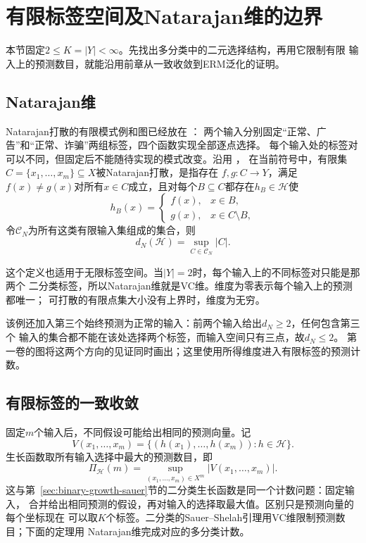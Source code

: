 \section{有限标签空间及Natarajan维的边界}
\label{sec:multiclass-dimensions}

本节固定$2\leq K=|Y|<\infty$。先找出多分类中的二元选择结构，再用它限制有限
输入上的预测数目，就能沿用前章从一致收敛到ERM泛化的证明。

\subsection{Natarajan维}

Natarajan打散的有限模式例和图已经放在
：
两个输入分别固定“正常、广告”和“正常、诈骗”两组标签，四个函数实现全部逐点选择。
每个输入处的标签对可以不同，但固定后不能随待实现的模式改变。沿用
，
在当前符号中，有限集$C=\{x_1,\ldots,x_m\}\subseteq X$被Natarajan打散，是指存在
$f,g:C\to Y$，满足
$f(x)\neq g(x)$对所有$x\in C$成立，且对每个$B\subseteq C$都存在$h_B\in\mathcal H$使
\begin{equation}
 h_B(x)=\begin{cases}f(x),&x\in B,\\g(x),&x\in C\setminus B,\end{cases}
 \label{eq:learning-natarajan-shattering}
\end{equation}
令$\mathcal C_N$为所有这类有限输入集组成的集合，则
\[
 d_N(\mathcal H)=\sup_{C\in\mathcal C_N}|C|.
\]

这个定义也适用于无限标签空间。当$|Y|=2$时，每个输入上的不同标签对只能是那两个
二分类标签，所以Natarajan维就是VC维。维度为零表示每个输入上的预测都唯一；
可打散的有限点集大小没有上界时，维度为无穷。

该例还加入第三个始终预测为正常的输入：前两个输入给出$d_N\geq2$，任何包含第三个
输入的集合都不能在该处选择两个标签，而输入空间只有三点，故$d_N\leq2$。
第一卷的图将这两个方向的见证同时画出；这里使用所得维度进入有限标签的预测计数。

\subsection{有限标签的一致收敛}

固定$m$个输入后，不同假设可能给出相同的预测向量。记
\[
 V(x_1,\ldots,x_m)
 =\{(h(x_1),\ldots,h(x_m)):h\in\mathcal H\}.
\]
生长函数取所有输入选择中最大的预测数目，即
\[
 \Pi_{\mathcal H}(m)=\sup_{(x_1,\ldots,x_m)\in X^m}|V(x_1,\ldots,x_m)|.
\]
这与第~\ref{sec:binary-growth-sauer}节的二分类生长函数是同一个计数问题：固定输入，
合并给出相同预测的假设，再对输入的选择取最大值。区别只是预测向量的每个坐标现在
可以取$K$个标签。二分类的Sauer--Shelah引理用VC维限制预测数目；下面的定理用
Natarajan维完成对应的多分类计数。

